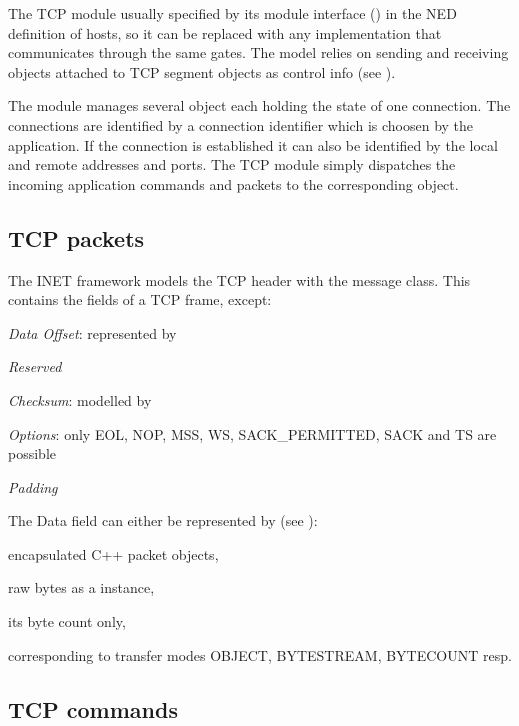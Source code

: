The TCP module usually specified by its module interface
() in the NED definition of hosts, so it can be replaced with any implementation
that communicates through the same gates. The  model relies on
sending and receiving  objects
attached to TCP segment objects as control info (see ).

The  module manages several  object each
holding the state of one connection. The connections are identified
by a connection identifier which is choosen by the application.
If the connection is established it can also be identified by
the local and remote addresses and ports. The TCP module simply
dispatches the incoming application commands and packets to
the corresponding object.

\subsection{TCP packets}
\label{subsec:tcp_packets}

The INET framework models the TCP header with the  message class.
This contains the fields of a TCP frame, except:
\begin{compactitem}
  \item \emph{Data Offset}: represented by 
  \item \emph{Reserved}
  \item \emph{Checksum}: modelled by 
  \item \emph{Options}: only EOL, NOP, MSS, WS, SACK\_PERMITTED, SACK and TS are possible
  \item \emph{Padding}
\end{compactitem}

The Data field can either be represented by (see ):
\begin{compactitem}
  \item encapsulated C++ packet objects,
  \item raw bytes as a  instance,
  \item its byte count only,
\end{compactitem}
corresponding to transfer modes OBJECT, BYTESTREAM, BYTECOUNT resp.


\subsection{TCP commands}

